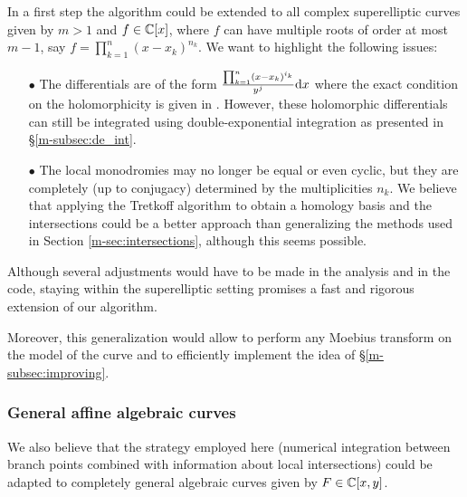 \documentclass[main.tex]{subfiles}
\begin{document}
  In a first step the algorithm could be
  extended to all complex superelliptic curves given by $m > 1$ and $f \in
  \mathbb{C}[x]$, where $f$ can have multiple roots of order at most $m-1$, say 
  $f = \prod_{k=1}^n (x-x_k)^{n_k}$.
  We want to highlight the following issues:
  \begin{itemize}
   \item[$\bullet$] The differentials are of the form
   $\frac{\prod_{k=1}^n (x-x_k)^{i_k}}{y^j}\mathrm d x$
    where the exact condition on the holomorphicity is given in \cite[Theorem 3]{Koo1991}.
   However, these holomorphic differentials can still be integrated using double-exponential integration as presented
   in \S \ref{m-subsec:de_int}.
   \item[$\bullet$] The local monodromies may no longer be equal or even cyclic, but they are completely (up
   to conjugacy) determined
   by the multiplicities $n_k$. We believe that applying the Tretkoff algorithm \cite{TT1984}
   to obtain a homology basis and the intersections could be a better approach than generalizing the methods
   used in Section \ref{m-sec:intersections}, although this seems possible.
  \end{itemize}

  Although several adjustments would have to be made in the analysis and in the
  code, staying within the superelliptic setting promises
  a fast and rigorous extension of our algorithm. 

  Moreover, this generalization would allow to perform any Moebius transform on the
  model of the curve and to efficiently implement the idea of \S \ref{m-subsec:improving}.

  \subsubsection{General affine algebraic curves}
  
  We also believe that the strategy employed here (numerical integration between
  branch points combined with information about local intersections) could
  be adapted to completely general algebraic curves given by $F \in \mathbb{C}[x,y]$.
\end{document}

